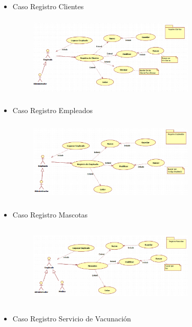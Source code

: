 \documentclass[12pt,a4paper,oneside]{book}
\begin{document}
\begin{enumerate}
\begin{enumerate}
\begin{enumerate}
\begin{itemize}
									\item Caso Registro Clientes
									
										\begin{figure}[htb]
											\centering \includegraphics[width=8cm, height=4cm]{img/casosdeuso/registrocliente.png}
										\end{figure}
									
									\item Caso Registro Empleados
									
										\begin{figure}[htb]
											\centering \includegraphics[width=8cm, height=4cm]{img/casosdeuso/registroempleado.png}
										\end{figure}
								
									\item Caso Registro Mascotas
									
										\begin{figure}[htb]
											\centering \includegraphics[width=8cm, height=4cm]{img/casosdeuso/registromascota.png}
										\end{figure}
						\newpage
									\item Caso Registro Servicio de Vacunación
									

\end{itemize}
\end{enumerate}
\end{enumerate}
\end{enumerate}
\end{document}
